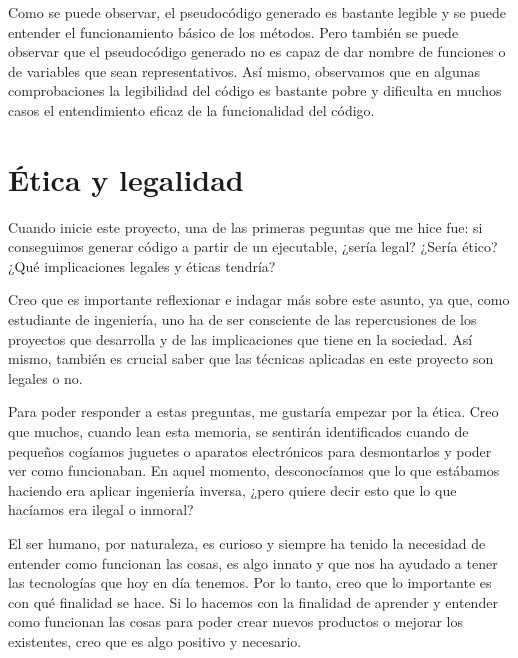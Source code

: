 Como se puede observar, el pseudocódigo generado es bastante legible y se puede
entender el funcionamiento básico de los métodos. Pero también se puede observar
que el pseudocódigo generado no es capaz de dar nombre de funciones o de variables
que sean representativos. Así mismo, observamos que en algunas comprobaciones la
legibilidad del código es bastante pobre y dificulta en muchos casos el entendimiento
eficaz de la funcionalidad del código.

\section{Ética y legalidad}
\label{sec:etica_legalidad}


Cuando inicie este proyecto, una de las primeras peguntas que me hice fue: si conseguimos
generar código a partir de un ejecutable, ¿sería legal? ¿Sería ético? ¿Qué implicaciones
legales y éticas tendría?

Creo que es importante reflexionar e indagar más sobre este asunto, ya que, como estudiante
de ingeniería, uno ha de ser consciente de las repercusiones de los proyectos que desarrolla y
de las implicaciones que tiene en la sociedad. Así mismo, también es crucial saber que las
técnicas aplicadas en este proyecto son legales o no.

Para poder responder a estas preguntas, me gustaría empezar por la ética. Creo que muchos, cuando
lean esta memoria, se sentirán identificados cuando de pequeños cogíamos juguetes o aparatos electrónicos
para desmontarlos y poder ver como funcionaban. En aquel momento, desconocíamos que lo que estábamos
haciendo era aplicar ingeniería inversa, ¿pero quiere decir esto que lo que hacíamos era ilegal o inmoral?

El ser humano, por naturaleza, es curioso y siempre ha tenido la necesidad de entender como funcionan
las cosas, es algo innato y que nos ha ayudado a tener las tecnologías que hoy en día tenemos. Por lo tanto,
creo que lo importante es con qué finalidad se hace. Si lo hacemos con la finalidad de aprender y entender
como funcionan las cosas para poder crear nuevos productos o mejorar los existentes, creo que es algo
positivo y necesario.

